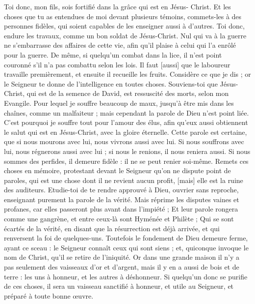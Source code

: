 \begin{multicols}{2}
\VerseOne{}Toi donc, mon fils, sois fortifié dans la grâce qui est en Jésus- Christ.
Et les choses que tu as entendues de moi devant plusieurs témoins, commets-les à des personnes fidèles, qui soient capables de les enseigner aussi à d'autres.
Toi donc, endure les travaux, comme un bon soldat de Jésus-Christ.
Nul qui va à la guerre ne s'embarrasse des affaires de cette vie, afin qu'il plaise à celui qui l'a enrôlé pour la guerre.
De même, si quelqu'un combat dans la lice, il n'est point couronné s'il n'a pas combattu selon les lois.
Il faut [aussi] que le laboureur travaille premièrement, et ensuite il recueille les fruits.
Considère ce que je dis ; or le Seigneur te donne de l’intelligence en toutes choses.
Souviens-toi que Jésus-Christ, qui est de la semence de David, est ressuscité des morts, selon mon Evangile.
Pour lequel je souffre beaucoup de maux, jusqu'à être mis dans les chaînes, comme un malfaiteur ; mais cependant la parole de Dieu n'est point liée.
C'est pourquoi je souffre tout pour l'amour des élus, afin qu'eux aussi obtiennent le salut qui est en Jésus-Christ, avec la gloire éternelle.
Cette parole est certaine, que si nous mourons avec lui, nous vivrons aussi avec lui.
Si nous souffrons avec lui, nous régnerons aussi avec lui ; si nous le renions, il nous reniera aussi.
Si nous sommes des perfides, il demeure fidèle : il ne se peut renier soi-même.
Remets ces choses en mémoire, protestant devant le Seigneur qu'on ne dispute point de paroles, qui est une chose dont il ne revient aucun profit, [mais] elle est la ruine des auditeurs.
Etudie-toi de te rendre approuvé à Dieu, ouvrier sans reproche, enseignant purement la parole de la vérité.
Mais réprime les disputes vaines et profanes, car elles passeront plus avant dans l'impiété ;
Et leur parole rongera comme une gangrène, et entre ceux-là sont Hyménée et Philète ;
Qui se sont écartés de la vérité, en disant que la résurrection est déjà arrivée, et qui renversent la foi de quelques-uns.
Toutefois le fondement de Dieu demeure ferme, ayant ce sceau : le Seigneur connaît ceux qui sont siens ; et, quiconque invoque le nom de Christ, qu'il se retire de l'iniquité.
Or dans une grande maison il n'y a pas seulement des vaisseaux d'or et d'argent, mais il y en a aussi de bois et de terre : les uns à honneur, et les autres à déshonneur.
Si quelqu'un donc se purifie de ces choses, il sera un vaisseau sanctifié à honneur, et utile au Seigneur, et préparé à toute bonne œuvre.

\end{multicols}
